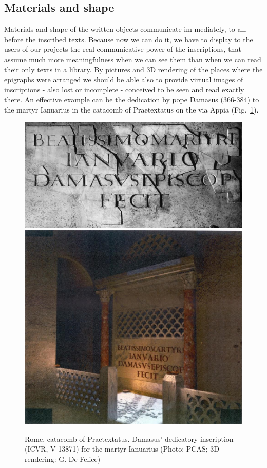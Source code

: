 \documentclass[amsthm,ebook]{saparticle}
\begin{document}
\subsection{Materials and shape }


Materials and shape of the written objects communicate im-mediately, to all, before the inscribed texts. Because now we
can do it, we have to display to the users of our projects the real communicative power of the inscriptions, that
assume much more meaningfulness when we can see them than when we can read their only texts in a library. By pictures
and 3D rendering of the places where the epigraphs were arranged we should be able also to provide virtual images of
inscriptions {}- also lost or incomplete - conceived to be seen and read exactly there. An effective example can be
the dedication by pope Damasus (366-384) to the martyr Ianuarius in the catacomb of Praetextatus on the via Appia (Fig.~\ref{fig:6}). 

\begin{figure}[!bp]
\centering
 \includegraphics[width=\columnwidth]{FelleVisualFeaturesofinscriptionsEAGLE2016FullPaper-img008.jpg}
 \includegraphics[width=\columnwidth]{FelleVisualFeaturesofinscriptionsEAGLE2016FullPaper-img009.jpg}
\caption{Rome, catacomb of Praetextatus. Damasus’ dedicatory inscription (ICVR, V 13871) for the martyr Ianuarius (Photo:
PCAS; 3D rendering: G. De Felice)}
\label{fig:6}
\end{figure}
\end{document}
